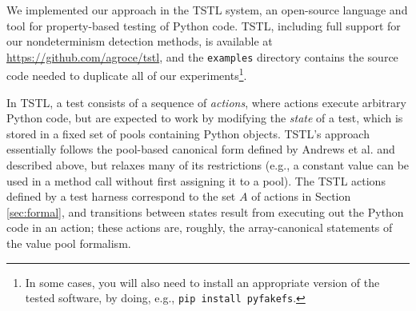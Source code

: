 We implemented our approach in the TSTL \cite{NFM15,ISSTA15,tstlsttt}
system, an open-source
language and tool for property-based testing
\cite{Hypothesis,ClaessenH00} of Python code.   TSTL, including full
support for our nondeterminism detection methods, is available at
\url{https://github.com/agroce/tstl}, and the {\tt examples} directory
contains the source code needed to duplicate all of our
experiments\footnote{In some cases, you will also need to install an
  appropriate version of the tested software, by doing, e.g., {\tt pip
    install pyfakefs}.}.
\begin{comment}
TSTL can also be installed using Python's {\tt pip} tool, by typing
{\tt pip install tstl}; you will need to clone the github repository
to have access to the case studies used in the paper, however.

TSTL has
been used to detect (and usually fix) errors in a number of widely
used Python libraries, the Python implementation itself, the Solidity
compiler and a Solidity static analysis tool, and Mac OS \cite{tstl}.

\begin{figure}
  {\scriptsize
\begin{code}
pool: <int> 5
pool: <l> 5
pool: <s> 5
\vspace{0.1in}
<int> := <[1..20]>
<l> := []
<l> := list(<s>)
<s> := set()
<s> := set(<l>)
\vspace{0.1in}
<l>.append(<int>)
\{ValueError\} <l>.remove(<int>)
<s>.add(<int>)
\{KeyError\} <s>.remove(<int>)
\vspace{0.1in}
property: len(<l>) >= len(set(<l,1>))
property: len(<s>) == len(list(<s,1>))
\end{code}
}
\caption{Simple TSTL harness testing lists and sets}
\label{fig:simple}
\end{figure}
\end{comment}

In TSTL, a test consists of a sequence of
\emph{actions}, where actions execute arbitrary Python code, but are
expected to work by modifying the \emph{state} of a test, which is
stored in a fixed set of pools containing Python objects.  TSTL's
approach essentially follows the pool-based canonical form defined by
Andrews et al. and described above, but relaxes many of its restrictions
(e.g., a constant value can be used in a method call without first
assigning it to a pool). The
TSTL actions defined by a test harness correspond to the set $A$ of
actions in Section \ref{sec:formal}, and transitions between states
result from executing out the Python code in an action; these actions
are, roughly, the array-canonical statements of the value pool
formalism.

